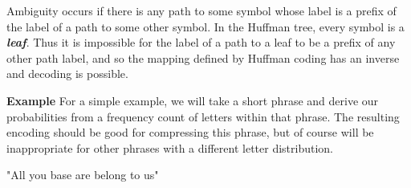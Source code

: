 {
Ambiguity occurs if there is any path to some symbol whose label is a prefix of the label of a path to some other symbol. In the Huffman tree, every symbol is a \textbf{\emph{leaf}}. Thus it is impossible for the label of a path to a leaf to be a prefix of any other path label, and so the mapping defined by Huffman coding has an inverse and decoding is possible.
}
{
\noindent \textbf{Example}
For a simple example, we will take a short phrase and derive our probabilities from a frequency count of letters within that phrase. The resulting encoding should be good for compressing this phrase, but of course will be inappropriate for other phrases with a different letter distribution.

"All you base are belong to us"
}




